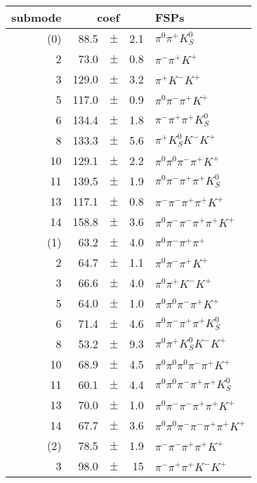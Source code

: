 \begin{center} 
\begin{tabular}{|rrcrl|}
\hline
submode &\multicolumn{3}{c}{coef}& FSPs\\
\hline
[0](0)  & 88.5  & $\pm$ & 2.1   & $\pi^0 \pi^+ K_S^0 $ \\
2       & 73.0  & $\pm$ & 0.8   & $\pi^- \pi^+ K^+ $ \\
3       &129.0  & $\pm$ & 3.2   & $\pi^+ K^- K^+ $ \\
5       &117.0  & $\pm$ & 0.9   & $\pi^0 \pi^- \pi^+ K^+ $ \\
6       &134.4  & $\pm$ & 1.8   & $\pi^- \pi^+ \pi^+ K_S^0 $ \\
8       &133.3  & $\pm$ & 5.6   & $\pi^+ K_S^0 K^- K^+ $ \\
10      &129.1  & $\pm$ & 2.2   & $\pi^0 \pi^0 \pi^- \pi^+ K^+ $ \\
11      &139.5  & $\pm$ & 1.9   & $\pi^0 \pi^- \pi^+ \pi^+ K_S^0 $ \\
13      &117.1  & $\pm$ & 0.8   & $\pi^- \pi^- \pi^+ \pi^+ K^+ $ \\
14      &158.8  & $\pm$ & 3.6   & $\pi^0 \pi^- \pi^- \pi^+ \pi^+ K^+ $ \\
\hline                     
[1](1)  & 63.2  & $\pm$ & 4.0   & $\pi^0 \pi^- \pi^+ \pi^+ $ \\
2       & 64.7  & $\pm$ & 1.1   & $\pi^0 \pi^- \pi^+ K^+ $ \\
3       & 66.6  & $\pm$ & 4.0   & $\pi^0 \pi^+ K^- K^+ $ \\
5       & 64.0  & $\pm$ & 1.0   & $\pi^0 \pi^0 \pi^- \pi^+ K^+ $ \\
6       & 71.4  & $\pm$ & 4.6   & $\pi^0 \pi^- \pi^+ \pi^+ K_S^0 $ \\
8       & 53.2  & $\pm$ & 9.3   & $\pi^0 \pi^+ K_S^0 K^- K^+ $ \\
10      & 68.9  & $\pm$ & 4.5   & $\pi^0 \pi^0 \pi^0 \pi^- \pi^+ K^+ $ \\
11      & 60.1  & $\pm$ & 4.4   & $\pi^0 \pi^0 \pi^- \pi^+ \pi^+ K_S^0 $ \\
13      & 70.0  & $\pm$ & 1.0   & $\pi^0 \pi^- \pi^- \pi^+ \pi^+ K^+ $ \\
14      & 67.7  & $\pm$ & 3.6   & $\pi^0 \pi^0 \pi^- \pi^- \pi^+ \pi^+ K^+ $ \\
\hline                     
[3](2)  & 78.5  & $\pm$ & 1.9   & $\pi^- \pi^- \pi^+ \pi^+ K^+ $ \\
3       & 98.0  & $\pm$ & 15    & $\pi^- \pi^+ \pi^+ K^- K^+ $ \\

\end{tabular}
\end{center}
